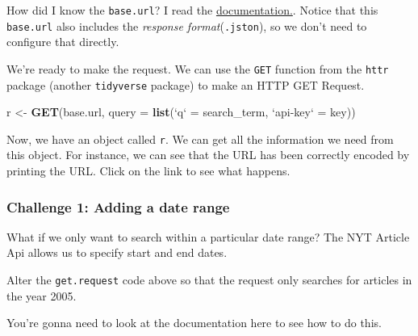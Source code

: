 \documentclass[]{book}
\newenvironment{Shaded}{\begin{snugshade}}{\end{snugshade}}
\newcommand{\KeywordTok}[1]{\textcolor[rgb]{0.13,0.29,0.53}{\textbf{#1}}}
\newcommand{\DataTypeTok}[1]{\textcolor[rgb]{0.13,0.29,0.53}{#1}}
\newcommand{\StringTok}[1]{\textcolor[rgb]{0.31,0.60,0.02}{#1}}
\newcommand{\CommentTok}[1]{\textcolor[rgb]{0.56,0.35,0.01}{\textit{#1}}}
\newcommand{\OperatorTok}[1]{\textcolor[rgb]{0.81,0.36,0.00}{\textbf{#1}}}
\newcommand{\NormalTok}[1]{#1}
\begin{document}
How did I know the \texttt{base.url}? I read the
\href{https://developer.nytimes.com/docs/articlesearch-product/1/routes/articlesearch.json/get}{documentation.}.
Notice that this \texttt{base.url} also includes the \emph{response
format}(\texttt{.jston}), so we don't need to configure that directly.

We're ready to make the request. We can use the \texttt{GET} function
from the \texttt{httr} package (another \texttt{tidyverse} package) to
make an HTTP GET Request.

\begin{Shaded}
\begin{Highlighting}[]
\NormalTok{r <-}\StringTok{ }\KeywordTok{GET}\NormalTok{(base.url, }\DataTypeTok{query =} \KeywordTok{list}\NormalTok{(}\StringTok{`}\DataTypeTok{q}\StringTok{`}\NormalTok{ =}\StringTok{ }\NormalTok{search_term,}
                                \StringTok{`}\DataTypeTok{api-key}\StringTok{`}\NormalTok{ =}\StringTok{ }\NormalTok{key))}
\end{Highlighting}
\end{Shaded}

Now, we have an object called \texttt{r}. We can get all the information
we need from this object. For instance, we can see that the URL has been
correctly encoded by printing the URL. Click on the link to see what
happens.

\begin{Shaded}
\end{Shaded}

\subsubsection*{Challenge 1: Adding a date
range}\label{challenge-1-adding-a-date-range}

What if we only want to search within a particular date range? The NYT
Article Api allows us to specify start and end dates.

Alter the \texttt{get.request} code above so that the request only
searches for articles in the year 2005.

You're gonna need to look at the documentation here to see how to do
this.
\end{document}
